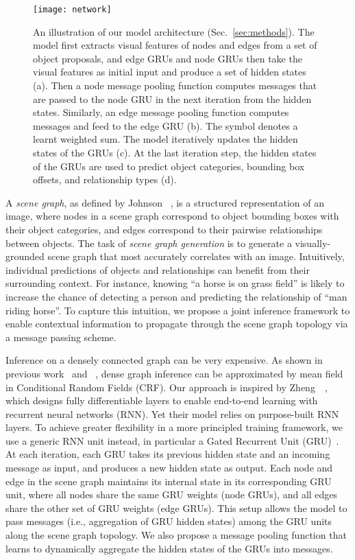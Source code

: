 \documentclass[10pt,twocolumn,letterpaper]{article}
\begin{document}
\begin{figure*}[!htp]
  \begin{center}
    \texttt{[image: network]}
 \vspace*{-15pt}

  \end{center}
   \caption{An illustration of our model architecture (Sec.~\ref{sec:methods}). The model first extracts visual features of nodes and edges from a set of object proposals, and edge GRUs and node GRUs then take the visual features as initial input and produce a set of hidden states (a). Then a node message pooling function computes messages that are passed to the node GRU in the next iteration from the hidden states.  Similarly, an edge message pooling function computes messages and feed to the edge GRU (b). The  symbol denotes a learnt weighted sum. The model iteratively updates the hidden states of the GRUs (c). At the last iteration step, the hidden states of the GRUs are used to predict object categories, bounding box offsets, and relationship types (d).}
  \label{fig:architecture}
\end{figure*}

A \emph{scene graph}, as defined by Johnson \etal~\cite{Johnson2015-lm}, is a structured representation of an image, where nodes in a scene graph correspond to object bounding boxes with their object categories, and edges correspond to their pairwise relationships between objects. 
The task of \emph{scene graph generation} is to generate a visually-grounded scene 
graph that most accurately correlates with an image.
Intuitively, individual predictions of objects and relationships can benefit from their surrounding context.
For instance, knowing ``a horse is on grass field'' is likely to increase the chance of detecting a person and predicting the relationship of ``man riding horse''.
To capture this intuition, we propose a joint inference framework to enable contextual information to propagate through the scene graph topology via a message passing scheme.


Inference on a densely connected graph can be very expensive. As shown in previous work~\cite{dense_crf} and ~\cite{crfasrnn}, dense graph inference can be approximated by mean field in Conditional Random Fields (CRF). Our approach is inspired by Zheng~\etal~\cite{crfasrnn}, which designs fully differentiable layers to enable end-to-end learning with recurrent neural networks (RNN). Yet their model relies on purpose-built RNN layers. To achieve greater flexibility in a more principled training framework, we use a generic RNN unit instead, in particular a Gated Recurrent Unit (GRU)~\cite{gru}. At each iteration, each GRU takes its previous hidden state and an incoming message as input, and produces a new hidden state as output. Each node and edge in the scene graph maintains its internal state in its corresponding GRU unit, where all nodes share the same GRU weights (node GRUs), and all edges share the other set of GRU weights (edge GRUs).  This setup allows the model to pass messages (i.e., aggregation of GRU hidden states) among the GRU units along the scene graph topology. We also propose a message pooling function that learns to dynamically aggregate the hidden states of the GRUs into messages.
\end{document}
